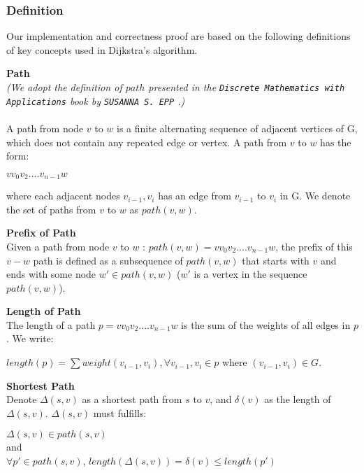 
\subsubsection{Definition}
Our implementation and correctness proof are based on the following definitions of key concepts used in Dijkstra's algorithm. 
\theoremstyle{definition}
\begin{definition}\textbf{Path}\\
\textit{(We adopt the definition of $path$ presented in the \texttt{Discrete Mathematics with Applications} book by \texttt{SUSANNA S. EPP} \cite{discrete}.)}
\\\\
A path from node $v$ to $w$ is a finite alternating sequence of adjacent vertices of G, which does not contain any repeated edge or vertex. A path from $v$ to $w$ has the form: 
\begin{center}
 $vv_0v_2....v_{n-1}w$ 
\end{center}
where each adjacent nodes $v_{i-1}, v_i$ has an edge from $v_{i-1}$ to $v_i$ in G. We denote the set of paths from $v$ to $w$ as $path(v, w)$.
\end{definition}
\tab
\begin{definition}\textbf{Prefix of Path}\\
Given a path from node $v$ to $w$ : $path(v, w) = vv_0v_2....v_{n-1}w$, the prefix of this $v-w$ path is defined as a subsequence of $path(v, w)$ that starts with $v$ and ends with some node $w' \in path(v, w)$ ($w'$ is a vertex in the sequence $path(v, w)$). 
\end{definition}
\tab
\begin{definition}\textbf{Length of Path} \\
The length of a path $p = vv_0v_2....v_{n-1}w$ is the sum of the weights of all edges in $p$. We write: 
\begin{center}
  $length(p) = \sum weight(v_{i-1}, v_i), \forall v_{i-1}, v_i \in p$ where $(v_{i-1}, v_i) \in G$. 
\end{center} 
\end{definition}
\tab
\begin{definition}\textbf{Shortest Path}\\
Denote $\Delta(s, v)$ as a shortest path from $s$ to $v$, and $\delta(v)$ as the length of $\Delta(s, v)$. $\Delta(s, v)$ must fulfills: 
\begin{center}
$\Delta(s, v) \in path(s, v)$ 
\\
and 
\\
$\forall p' \in path(s, v)$, $length(\Delta(s, v)) = \delta(v) \leq length(p')$
\end{center}
\end{definition}